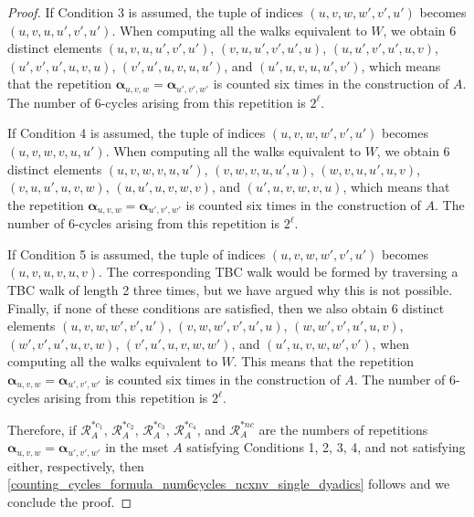 \documentclass[10pt,a4paper]{amsart}
\newcommand{\balpha}{{\boldsymbol \alpha}}
\begin{document}
\begin{proof}
If Condition 3 is assumed, the tuple of indices $(u,v,w,w',v',u')$ becomes $(u,v,u,u',v',u')$. 
When computing all the walks equivalent to $W$, we obtain 6 distinct elements $(u,v,u,u',v',u')$, $(v,u,u',v',u',u)$, $(u,u',v',u',u,v)$, $(u',v',u',u,v,u)$, $(v',u',u,v,u,u')$, and $(u',u,v,u,u',v')$, which means that the repetition $\balpha_{u,v,w}=\balpha_{u',v',w'}$ is counted six times in the construction of $A$. The number of 6-cycles arising from this repetition is $2^\ell$.

If Condition 4 is assumed, the tuple of indices $(u,v,w,w',v',u')$ becomes $(u,v,w,v,u,u')$. 
When computing all the walks equivalent to $W$, we obtain 6 distinct elements $(u,v,w,v,u,u')$, $(v,w,v,u,u',u)$, $(w,v,u,u',u,v)$, $(v,u,u',u,v,w)$, $(u,u',u,v,w,v)$, and $(u',u,v,w,v,u)$, which means that the repetition $\balpha_{u,v,w}=\balpha_{u',v',w'}$ is counted six times in the construction of $A$. The number of 6-cycles arising from this repetition is $2^\ell$.

If Condition 5 is assumed, the tuple of indices $(u,v,w,w',v',u')$ becomes $(u,v,u,v,u,v)$. The corresponding TBC walk would be formed by traversing a TBC walk of length 2 three times, but we have argued why this is not possible. Finally, if none of these conditions are satisfied, then we also obtain 6 distinct elements $(u,v,w,w',v',u')$, $(v,w,w',v',u',u)$, $(w,w',v',u',u,v)$, $(w',v',u',u,v,w)$, $(v',u',u,v,w,w')$, and $(u',u,v,w,w',v')$, when computing all the walks equivalent to $W$. This means that the repetition $\balpha_{u,v,w}=\balpha_{u',v',w'}$ is counted six times in the construction of $A$. The number of 6-cycles arising from this repetition is $2^\ell$.

Therefore, if $\mathcal{R}_{A}^{*c_1}$, $\mathcal{R}_{A}^{*c_2}$, $\mathcal{R}_{A}^{*c_3}$, $\mathcal{R}_{A}^{*c_4}$, and $\mathcal{R}_{A}^{*nc}$ are the numbers of repetitions $\balpha_{u,v,w}=\balpha_{u',v',w'}$ in the mset $A$ satisfying Conditions 1, 2, 3, 4, and not satisfying either, respectively, then \eqref{counting_cycles_formula_num6cycles_ncxnv_single_dyadics} follows and we conclude the proof.
\end{proof}
\end{document}
